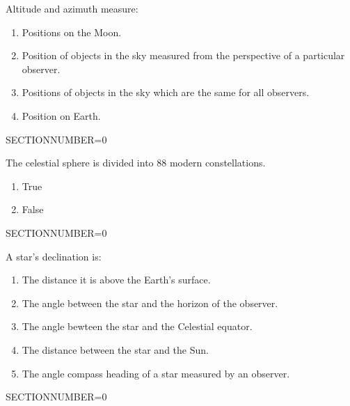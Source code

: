 \documentclass[11pt]{article}
\begin{document}
\begin{enumerate}
\begin{minipage}{\textwidth}
\begin{minipage}{\textwidth}
\item Altitude and azimuth measure:
\begin{enumerate} 
\setlength{\itemsep}{1pt} 
\setlength{\parskip}{0pt} 
\setlength{\parsep}{0pt}
\setlength{\multicolsep}{1pt} 
\item Positions on the Moon.
\item Position of objects in the sky measured from the perspective of a particular observer.
\item Positions of objects in the sky which are the same for all observers.
\item Position on Earth.
\end{enumerate} 
\end{minipage}
SECTIONNUMBER=0
\end{minipage}
\vskip 0.20in

\begin{minipage}{\textwidth}
\begin{minipage}{\textwidth}
\item The celestial sphere is divided into 88 modern constellations.
\begin{multicols}{3}
\begin{enumerate} 
\setlength{\itemsep}{1pt} 
\setlength{\parskip}{0pt} 
\setlength{\parsep}{0pt}
\setlength{\multicolsep}{1pt} 
\item True
\item False
\end{enumerate} 
\vfill 
\end{multicols}

\end{minipage}
SECTIONNUMBER=0
\end{minipage}
\vskip 0.20in

\begin{minipage}{\textwidth}
\begin{minipage}{\textwidth}
\item A star's declination is:
\begin{enumerate} 
\setlength{\itemsep}{1pt} 
\setlength{\parskip}{0pt} 
\setlength{\parsep}{0pt}
\setlength{\multicolsep}{1pt} 
\item The distance it is above the Earth's surface.
\item The angle between the star and the horizon of the observer.
\item The angle bewteen the star and the Celestial equator.
\item The distance between the star and the Sun.
\item The angle compass heading of a star measured by an observer.
\end{enumerate} 
\end{minipage}
SECTIONNUMBER=0
\end{minipage}
\vskip 0.20in


\end{enumerate}
\end{document}
